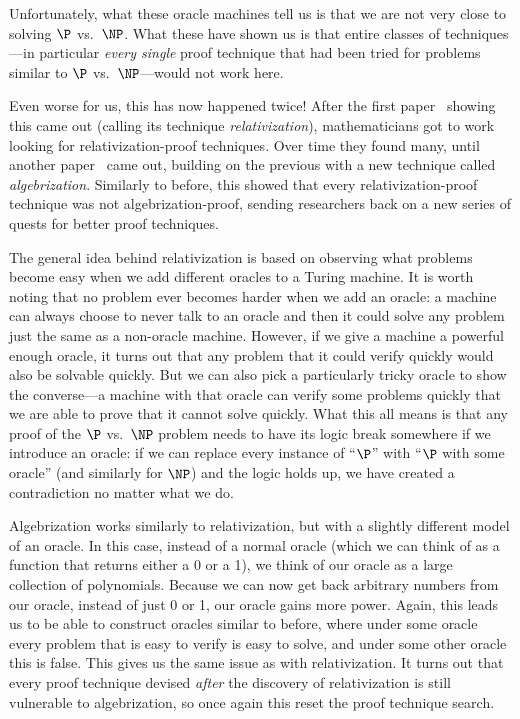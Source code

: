 \documentclass[english,12pt]{reedthesis}
\theoremstyle{plain}
\theoremstyle{definition}
\theoremstyle{remark}
\begin{document}
Unfortunately, what these oracle machines tell us is that we are not very close
to solving $\P$ vs.\ $\NP$. What these have shown us is that entire classes of
techniques---in particular \emph{every single} proof technique that had been tried
for problems similar to $\P$ vs.\ $\NP$---would not work here.

Even worse for us, this has now happened twice! After the first
paper~\cite{BGS75} showing this came out (calling its technique
\emph{relativization}), mathematicians got to work looking for
relativization-proof techniques. Over time they found many, until another
paper~\cite{AW09} came out, building on the previous with a new technique called
\emph{algebrization}. Similarly to before, this showed that every
relativization-proof technique was not algebrization-proof, sending researchers
back on a new series of quests for better proof techniques.

The general idea behind relativization is based on observing what problems
become easy when we add different oracles to a Turing machine. It is worth
noting that no problem ever becomes harder when we add an oracle: a machine can
always choose to never talk to an oracle and then it could solve any problem
just the same as a non-oracle machine. However, if we give a machine a powerful
enough oracle, it turns out that any problem that it could verify quickly would
also be solvable quickly. But we can also pick a particularly tricky oracle to
show the converse---a machine with that oracle can verify some problems quickly
that we are able to prove that it cannot solve quickly. What this all means is
that any proof of the $\P$ vs.\ $\NP$ problem needs to have its logic break
somewhere if we introduce an oracle: if we can replace every instance of
``$\P$'' with ``$\P$ with some oracle'' (and similarly for $\NP$) and the logic
holds up, we have created a contradiction no matter what we do.

Algebrization works similarly to relativization, but with a slightly different
model of an oracle. In this case, instead of a normal oracle (which we can think
of as a function that returns either a 0 or a 1), we think of our oracle as a
large collection of polynomials. Because we can now get back arbitrary numbers
from our oracle, instead of just 0 or 1, our oracle gains more power. Again,
this leads us to be able to construct oracles similar to before, where under
some oracle every problem that is easy to verify is easy to solve, and under
some other oracle this is false. This gives us the same issue as with
relativization. It turns out that every proof technique devised \emph{after} the
discovery of relativization is still vulnerable to algebrization, so once again
this reset the proof technique search.
\end{document}
